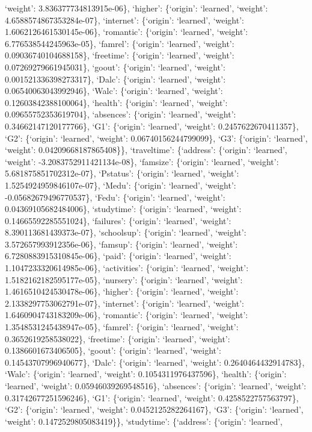 \documentclass[
]{article}
\begin{document}
`weight': 3.836377734813915e-06\}, `higher': \{`origin': `learned',
`weight': 4.6588574867353284e-07\}, `internet': \{`origin': `learned',
`weight': 1.6062126461530145e-06\}, `romantic': \{`origin': `learned',
`weight': 6.776538544245963e-05\}, `famrel': \{`origin': `learned',
`weight': 0.09036740104688158\}, `freetime': \{`origin': `learned',
`weight': 0.07269279661945031\}, `goout': \{`origin': `learned',
`weight': 0.001521336398273317\}, `Dalc': \{`origin': `learned',
`weight': 0.06540063043992946\}, `Walc': \{`origin': `learned',
`weight': 0.12603842388100064\}, `health': \{`origin': `learned',
`weight': 0.09655752353619704\}, `absences': \{`origin': `learned',
`weight': 0.34662147120177766\}, `G1': \{`origin': `learned', `weight':
0.2457622670411357\}, `G2': \{`origin': `learned', `weight':
0.06740156244799099\}, `G3': \{`origin': `learned', `weight':
0.04209668187865408\}\}, `traveltime': \{`address': \{`origin':
`learned', `weight': -3.2083752911421134e-08\}, `famsize': \{`origin':
`learned', `weight': 5.681875851702312e-07\}, `Pstatus': \{`origin':
`learned', `weight': 1.5254924959846107e-07\}, `Medu': \{`origin':
`learned', `weight': -0.05682679496770537\}, `Fedu': \{`origin':
`learned', `weight': 0.04369105682484006\}, `studytime': \{`origin':
`learned', `weight': 0.14665592285551024\}, `failures': \{`origin':
`learned', `weight': 8.390113681439373e-07\}, `schoolsup': \{`origin':
`learned', `weight': 3.572657993912356e-06\}, `famsup': \{`origin':
`learned', `weight': 6.7280883915310845e-06\}, `paid': \{`origin':
`learned', `weight': 1.1047233320614985e-06\}, `activities': \{`origin':
`learned', `weight': 1.5182162182595177e-05\}, `nursery': \{`origin':
`learned', `weight': 1.4616510424530478e-06\}, `higher': \{`origin':
`learned', `weight': 2.1338297753062791e-07\}, `internet': \{`origin':
`learned', `weight': 1.6460904743183209e-06\}, `romantic': \{`origin':
`learned', `weight': 1.3548531245438947e-05\}, `famrel': \{`origin':
`learned', `weight': 0.3652619258538022\}, `freetime': \{`origin':
`learned', `weight': 0.1386601673406505\}, `goout': \{`origin':
`learned', `weight': 0.14543707996940677\}, `Dalc': \{`origin':
`learned', `weight': 0.2640464432914783\}, `Walc': \{`origin':
`learned', `weight': 0.1054311976437596\}, `health': \{`origin':
`learned', `weight': 0.05946039269548516\}, `absences': \{`origin':
`learned', `weight': 0.31742677251596246\}, `G1': \{`origin': `learned',
`weight': 0.4258522757563797\}, `G2': \{`origin': `learned', `weight':
0.0452125282264167\}, `G3': \{`origin': `learned', `weight':
0.1472529805083419\}\}, `studytime': \{`address': \{`origin': `learned',
\end{document}
